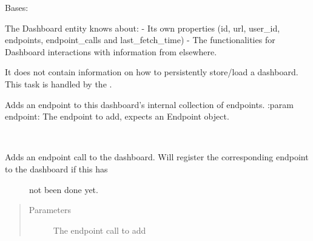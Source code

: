 \documentclass[letterpaper,10pt,english]{sphinxmanual}
\begin{document}
\begin{fulllineitems}
\label{\detokenize{pydash_app.dashboard.entity:pydash_app.dashboard.entity.Dashboard}}
Bases: 

The Dashboard entity knows about:
- Its own properties (id, url, user\_id, endpoints, endpoint\_calls and last\_fetch\_time)
- The functionalities for Dashboard interactions with information from elsewhere.

It does not contain information on how to persistently store/load a dashboard.
This task is handled by the .

\begin{fulllineitems}
\label{\detokenize{pydash_app.dashboard.entity:pydash_app.dashboard.entity.Dashboard.add_endpoint}}
Adds an endpoint to this dashboard’s internal collection of endpoints.
:param endpoint:  The endpoint to add, expects an Endpoint object.

\end{fulllineitems}


\begin{fulllineitems}
\label{\detokenize{pydash_app.dashboard.entity:pydash_app.dashboard.entity.Dashboard.add_endpoint_call}}~\begin{description}
\item[{Adds an endpoint call to the dashboard. Will register the corresponding endpoint to the dashboard if this has}] \leavevmode
not been done yet.

\end{description}
\begin{quote}\begin{description}
\item[{Parameters}] \leavevmode
{} \textendash{} The endpoint call to add


\end{description}
\end{quote}
\end{fulllineitems}
\end{fulllineitems}
\end{document}
